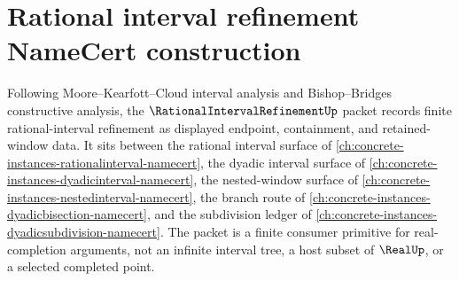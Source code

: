 \chapter{Rational interval refinement NameCert construction}
\label{ch:concrete-instances-rationalintervalrefinement-namecert}

Following Moore--Kearfott--Cloud interval analysis and Bishop--Bridges constructive analysis, the $\RationalIntervalRefinementUp$ packet records finite rational-interval refinement as displayed endpoint, containment, and retained-window data. It sits between the rational interval surface of \autoref{ch:concrete-instances-rationalinterval-namecert}, the dyadic interval surface of \autoref{ch:concrete-instances-dyadicinterval-namecert}, the nested-window surface of \autoref{ch:concrete-instances-nestedinterval-namecert}, the branch route of \autoref{ch:concrete-instances-dyadicbisection-namecert}, and the subdivision ledger of \autoref{ch:concrete-instances-dyadicsubdivision-namecert}. The packet is a finite consumer primitive for real-completion arguments, not an infinite interval tree, a host subset of $\RealUp$, or a selected completed point.

